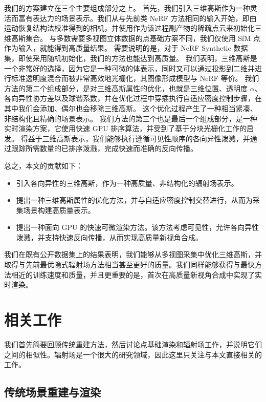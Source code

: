 我们的方案建立在三个主要组成部分之上。
首先，我们引入三维高斯作为一种灵活而富有表达力的场景表示。我们从与先前类 NeRF 方法相同的输入开始，即由运动恢复结构法校准得到的相机，并使用作为该过程副产物的稀疏点云来初始化三维高斯集合。
与多数需要多视图立体数据的点基础方案不同，我们仅使用 SfM 点作为输入，就能得到高质量结果。
需要说明的是，对于 NeRF Synthetic 数据集，即使采用随机初始化，我们的方法也能达到高质量。
我们表明，三维高斯是一个非常好的选择，因为它是一种可微的体表示，同时又可以通过投影到二维并进行标准透明度混合而被非常高效地光栅化，其图像形成模型与 NeRF 等价。
我们方法的第二个组成部分，是对三维高斯属性的优化，也就是三维位置、透明度 \(\alpha\)、各向异性协方差以及球谐系数，并在优化过程中穿插执行自适应密度控制步骤，在其中我们会添加、偶尔也会移除三维高斯。
这个优化过程产生了一种相当紧凑、非结构化且精确的场景表示。
我们方法的第三个也是最后一个组成部分，是一种实时渲染方案，它使用快速 GPU 排序算法，并受到了基于分块光栅化工作的启发。
得益于三维高斯表示，我们能够执行遵循可见性顺序的各向异性泼溅，并通过跟踪所需数量的已排序泼溅，完成快速而准确的反向传播。

总之，本文的贡献如下：
\begin{itemize}
    \item 引入各向异性的三维高斯，作为一种高质量、非结构化的辐射场表示。
    \item 提出一种三维高斯属性的优化方法，并与自适应密度控制交替进行，从而为采集场景构建高质量表示。
    \item 提出一种面向 GPU 的快速可微渲染方法。该方法考虑可见性，允许各向异性泼溅，并支持快速反向传播，从而实现高质量新视角合成。
\end{itemize}

我们在既有公开数据集上的结果表明，我们能够从多视图采集中优化三维高斯，并取得与先前最优隐式辐射场方法相当甚至更好的质量。我们同样能够获得与最快方法相近的训练速度和质量，并且更重要的是，首次在高质量新视角合成中实现了实时渲染。

\section{相关工作}

我们首先简要回顾传统重建方法，然后讨论点基础渲染和辐射场工作，并说明它们之间的相似性。辐射场是一个很大的研究领域，因此这里只关注与本文直接相关的工作。

\subsection{传统场景重建与渲染}

